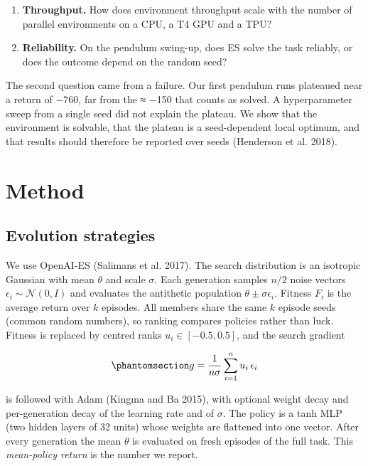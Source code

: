 \documentclass[
]{article}
\providecommand{\tightlist}{%
  \setlength{\itemsep}{0pt}\setlength{\parskip}{0pt}}
\begin{document}
\begin{enumerate}
\def\labelenumi{\arabic{enumi}.}
\tightlist
\item
  \textbf{Throughput.} How does environment throughput scale with the
  number of parallel environments on a CPU, a T4 GPU and a TPU?
\item
  \textbf{Reliability.} On the pendulum swing-up, does ES solve the task
  reliably, or does the outcome depend on the random seed?
\end{enumerate}

The second question came from a failure. Our first pendulum runs
plateaued near a return of −760, far from the ≈ −150 that counts as
solved. A hyperparameter sweep from a single seed did not explain the
plateau. We show that the environment is solvable, that the plateau is a
seed-dependent local optimum, and that results should therefore be
reported over seeds (Henderson et al. 2018).

\section{Method}\label{method}

\subsection{Evolution strategies}\label{evolution-strategies}

We use OpenAI-ES (Salimans et al. 2017). The search distribution is an
isotropic Gaussian with mean \(\theta\) and scale \(\sigma\). Each
generation samples \(n/2\) noise vectors
\(\epsilon_i\sim\mathcal N(0,I)\) and evaluates the antithetic
population \(\theta\pm\sigma\epsilon_i\). Fitness \(F_i\) is the average
return over \(k\) episodes. All members share the same \(k\) episode
seeds (common random numbers), so ranking compares policies rather than
luck. Fitness is replaced by centred ranks \(u_i\in[-0.5,0.5]\), and the
search gradient

\begin{equation}\protect\phantomsection\label{eq-grad}{
g = \frac{1}{n\sigma}\sum_{i=1}^{n} u_i\,\epsilon_i
}\end{equation}

is followed with Adam (Kingma and Ba 2015), with optional weight decay
and per-generation decay of the learning rate and of \(\sigma\). The
policy is a tanh MLP (two hidden layers of 32 units) whose weights are
flattened into one vector. After every generation the mean \(\theta\) is
evaluated on fresh episodes of the full task. This \emph{mean-policy
return} is the number we report.
\end{document}
